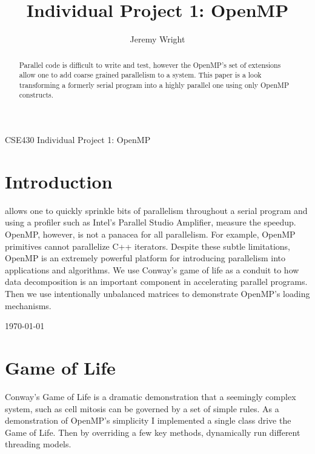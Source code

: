 \documentclass[journal,10pt,onecolumn]{IEEEtran}
\begin{document}
%
\title{Individual Project 1: OpenMP}
%

\author{Jeremy Wright}

{CSE430 Individual Project 1: OpenMP}

\maketitle


\begin{abstract}
Parallel code is difficult to write and test, however the OpenMP's set of 
extensions allow one to add coarse grained parallelism to a system. This paper 
is a look transforming a formerly serial program into a highly parallel one using 
only OpenMP constructs.
\end{abstract}

\listoffigures

\IEEEpeerreviewmaketitle

\section{Introduction}

 allows one to quickly sprinkle bits of parallelism throughout
a serial program and using a profiler such as Intel's Parallel Studio Amplifier, measure 
the speedup.  OpenMP, however, is not a panacea for all parallelism. For example, OpenMP primitives
cannot parallelize C++ iterators.  Despite these 
subtle limitations, OpenMP is an extremely powerful platform for introducing parallelism
into applications and algorithms.  We use Conway's game of life as a conduit to how 
data decomposition is an important component in accelerating parallel programs. Then we 
use intentionally unbalanced matrices to demonstrate OpenMP's loading mechanisms.

\hfill \today

\section{Game of Life}
Conway's Game of Life is a dramatic demonstration that a seemingly complex system,
such as cell mitosis can be governed by a set of simple rules. As a demonstration of
OpenMP's simplicity I implemented a single class drive the Game of Life. Then by 
overriding a few key methods, dynamically run different threading models. 
\end{document}
